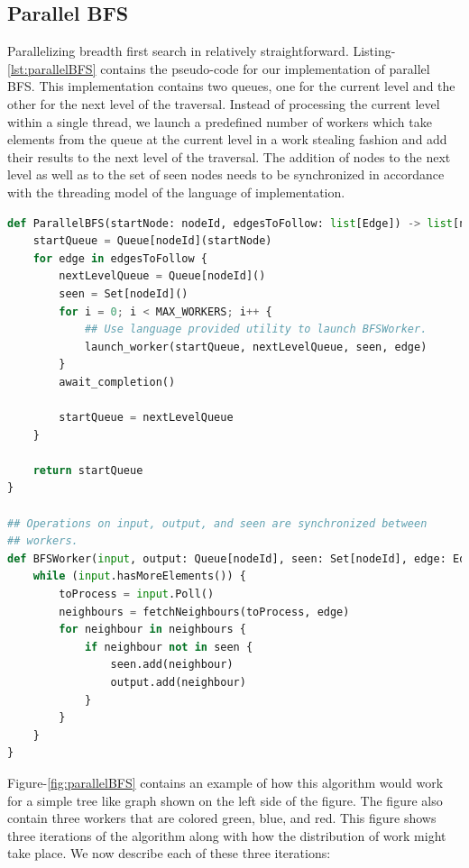 \subsection{Parallel BFS}
Parallelizing breadth first search in relatively straightforward.
Listing-\ref{lst:parallelBFS} contains the pseudo-code for our implementation of
parallel BFS. This implementation contains two queues, one for the current level
and the other for the next level of the traversal. Instead of processing the
current level within a single thread, we launch a predefined number of workers
which take elements from the queue at the current level in a work stealing
fashion and add their results to the next level of the traversal. The addition
of nodes to the next level as well as to the set of seen nodes needs to be
synchronized in accordance with the threading model of the language of
implementation.
\begin{lstlisting}[caption={Parallel BFS}, label={lst:parallelBFS}, captionpos=b, language=Python]
def ParallelBFS(startNode: nodeId, edgesToFollow: list[Edge]) -> list[nodeId] {
    startQueue = Queue[nodeId](startNode)
    for edge in edgesToFollow {
        nextLevelQueue = Queue[nodeId]()
        seen = Set[nodeId]()
        for i = 0; i < MAX_WORKERS; i++ {
            ## Use language provided utility to launch BFSWorker.
            launch_worker(startQueue, nextLevelQueue, seen, edge)
        }
        await_completion()

        startQueue = nextLevelQueue
    }

    return startQueue
}

## Operations on input, output, and seen are synchronized between
## workers. 
def BFSWorker(input, output: Queue[nodeId], seen: Set[nodeId], edge: Edge) {
    while (input.hasMoreElements()) {
        toProcess = input.Poll()
        neighbours = fetchNeighbours(toProcess, edge)
        for neighbour in neighbours {
            if neighbour not in seen {
                seen.add(neighbour)
                output.add(neighbour)
            }
        }
    }
}
\end{lstlisting}
Figure-\ref{fig:parallelBFS} contains an example of how this algorithm would
work for a simple tree like graph shown on the left side of the figure. The
figure also contain three workers that are colored green, blue, and red.
This figure shows three iterations of the algorithm along with how the
distribution of work might take place. We now describe each of these three
iterations:
